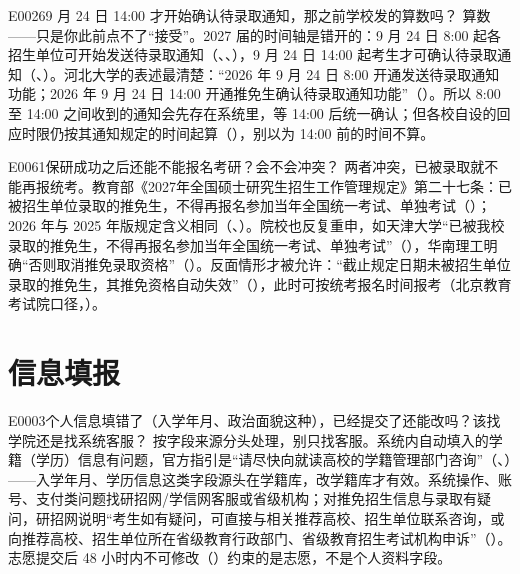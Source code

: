 \begin{qa}{E0026}{9 月 24 日 14:00 才开始确认待录取通知，那之前学校发的算数吗？}
算数——只是你此前点不了“接受”。2027 届的时间轴是错开的：9 月 24 日 8:00 起各招生单位可开始发送待录取通知（、、），9 月 24 日 14:00 起考生才可确认待录取通知（、）。河北大学的表述最清楚：“2026 年 9 月 24 日 8:00 开通发送待录取通知功能；2026 年 9 月 24 日 14:00 开通推免生确认待录取通知功能”（）。所以 8:00 至 14:00 之间收到的通知会先存在系统里，等 14:00 后统一确认；但各校自设的回应时限仍按其通知规定的时间起算（），别以为 14:00 前的时间不算。
\end{qa}

\begin{qa}{E0061}{保研成功之后还能不能报名考研？会不会冲突？}
两者冲突，已被录取就不能再报统考。教育部《2027年全国硕士研究生招生工作管理规定》第二十七条：已被招生单位录取的推免生，不得再报名参加当年全国统一考试、单独考试（）；2026 年与 2025 年版规定含义相同（、）。院校也反复重申，如天津大学“已被我校录取的推免生，不得再报名参加当年全国统一考试、单独考试”（），华南理工明确“否则取消推免录取资格”（）。反面情形才被允许：“截止规定日期未被招生单位录取的推免生，其推免资格自动失效”（），此时可按统考报名时间报考（北京教育考试院口径，）。
\end{qa}

\section{信息填报}
\begin{qa}{E0003}{个人信息填错了（入学年月、政治面貌这种），已经提交了还能改吗？该找学院还是找系统客服？}
按字段来源分头处理，别只找客服。系统内自动填入的学籍（学历）信息有问题，官方指引是“请尽快向就读高校的学籍管理部门咨询”（、）——入学年月、学历信息这类字段源头在学籍库，改学籍库才有效。系统操作、账号、支付类问题找研招网/学信网客服或省级机构；对推免招生信息与录取有疑问，研招网说明“考生如有疑问，可直接与相关推荐高校、招生单位联系咨询，或向推荐高校、招生单位所在省级教育行政部门、省级教育招生考试机构申诉”（）。志愿提交后 48 小时内不可修改（）约束的是志愿，不是个人资料字段。
\end{qa}

